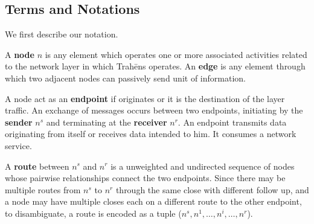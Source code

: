 \documentclass[12pt,oneside]{wlscirep}
\newcommand{\ProtoName}{Trah\={e}ns }
\begin{document}
\subsection{Terms and Notations}
We first describe our notation.\par
A \textbf{node} $n$ is any element which operates one or more associated activities related to the network layer in which \ProtoName operates. An \textbf{edge} is any element through which two adjacent nodes can passively send unit of information. \par 
A node act as an \textbf{endpoint} if originates or it is the destination of the layer traffic. An exchange of messages occurs between two endpoints, initiating by the \textbf{sender} $n^s$ and terminating at the \textbf{receiver} $n^r$. An endpoint transmits data originating from itself or receives data intended to him. It consumes a network service. \par 
A \textbf{route} between $n^s$ and $n^r$ is a unweighted and undirected sequence of nodes whose pairwise relationships connect the two endpoints. Since there may be multiple routes from $n^s$ to $n^r$ through the same close with different follow up, and a node may have multiple closes each on a different route to the other endpoint, to disambiguate, a route is encoded as a tuple ($n^s,n^1,\dots,n^i,\dots,n^r$). \par 
\end{document}
